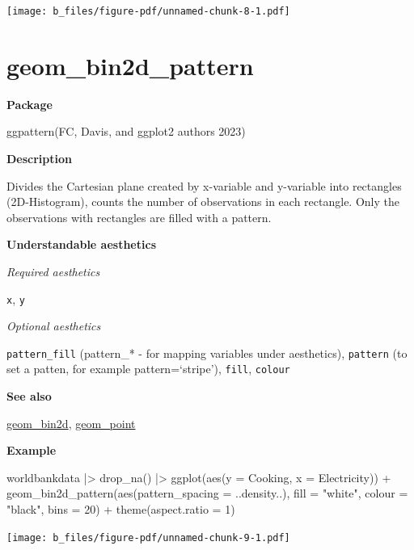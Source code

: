 \documentclass[
  letterpaper,
  DIV=11,
  numbers=noendperiod]{scrreprt}
\newenvironment{Shaded}{\begin{snugshade}}{\end{snugshade}}
\newcommand{\AttributeTok}[1]{\textcolor[rgb]{0.40,0.45,0.13}{#1}}
\newcommand{\DecValTok}[1]{\textcolor[rgb]{0.68,0.00,0.00}{#1}}
\newcommand{\FunctionTok}[1]{\textcolor[rgb]{0.28,0.35,0.67}{#1}}
\newcommand{\NormalTok}[1]{\textcolor[rgb]{0.00,0.23,0.31}{#1}}
\newcommand{\SpecialCharTok}[1]{\textcolor[rgb]{0.37,0.37,0.37}{#1}}
\newcommand{\StringTok}[1]{\textcolor[rgb]{0.13,0.47,0.30}{#1}}
\begin{document}
\texttt{[image: b\_files/figure-pdf/unnamed-chunk-8-1.pdf]}

\section{geom\_bin2d\_pattern}\label{bin2dpattern}

\textbf{Package}

ggpattern(FC, Davis, and ggplot2 authors 2023)

\textbf{Description}

Divides the Cartesian plane created by x-variable and y-variable into
rectangles (2D-Histogram), counts the number of observations in each
rectangle. Only the observations with rectangles are filled with a
pattern.

\textbf{Understandable aesthetics}

\emph{Required aesthetics}

\texttt{x}, \texttt{y}

\emph{Optional aesthetics}

\texttt{pattern\_fill} (pattern\_* - for mapping variables under
aesthetics), \texttt{pattern} (to set a patten, for example
pattern=`stripe'), \texttt{fill}, \texttt{colour}

\textbf{See also}

\hyperref[bin2d]{geom\_bin2d}, \hyperref[point]{geom\_point}

\textbf{Example}

\begin{Shaded}
\begin{Highlighting}[]
\NormalTok{worldbankdata }\SpecialCharTok{|\textgreater{}}
  \FunctionTok{drop\_na}\NormalTok{() }\SpecialCharTok{|\textgreater{}}
  \FunctionTok{ggplot}\NormalTok{(}\FunctionTok{aes}\NormalTok{(}\AttributeTok{y =}\NormalTok{ Cooking, }\AttributeTok{x =}\NormalTok{ Electricity)) }\SpecialCharTok{+}
  \FunctionTok{geom\_bin2d\_pattern}\NormalTok{(}\FunctionTok{aes}\NormalTok{(}\AttributeTok{pattern\_spacing =}\NormalTok{ ..density..), }\AttributeTok{fill =} \StringTok{"white"}\NormalTok{, }\AttributeTok{colour =} \StringTok{"black"}\NormalTok{, }\AttributeTok{bins =} \DecValTok{20}\NormalTok{) }\SpecialCharTok{+}
  \FunctionTok{theme}\NormalTok{(}\AttributeTok{aspect.ratio =} \DecValTok{1}\NormalTok{)}
\end{Highlighting}
\end{Shaded}

\texttt{[image: b\_files/figure-pdf/unnamed-chunk-9-1.pdf]}
\end{document}
